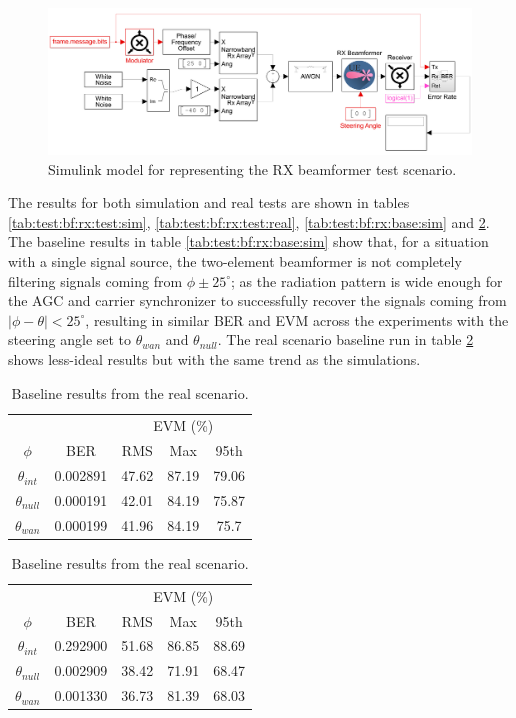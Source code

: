 \documentclass[12pt,a4paper]{report}
\begin{document}
\begin{figure}[h]
    \centering
    \includegraphics[width = \textwidth]{Figures/test_bf_rx_sim.png}
    \caption{Simulink model for representing the RX beamformer test scenario.}
    \label{fig:test:bf:rx:sim}
\end{figure}

The results for both simulation and real tests are shown in tables \ref{tab:test:bf:rx:test:sim}, \ref{tab:test:bf:rx:test:real}, \ref{tab:test:bf:rx:base:sim} and \ref{tab:test:bf:rx:base:real}. The baseline results in table \ref{tab:test:bf:rx:base:sim} show that, for a situation with a single signal source, the two-element beamformer is not completely filtering signals coming from $\phi \pm 25^\circ$; as the radiation pattern is wide enough for the AGC and carrier synchronizer to successfully recover the signals coming from $|\phi - \theta| < 25^\circ$, resulting in similar BER and EVM across the experiments with the steering angle set to $\theta_{wan}$ and $\theta_{null}$. The real scenario baseline run in table \ref{tab:test:bf:rx:base:real} shows less-ideal results but with the same trend as the simulations. 

\begin{table}[h]
    \centering
    \parbox{.45\linewidth}{
    \centering
    \begin{tabular}{c|c|c|c|c}
    & & \multicolumn{3}{c}{EVM (\%)} \\ 
    $\phi$ & BER & RMS & Max & 95th \\ \hline
    $\theta_{int}$ & 0.002891 & 47.62 & 87.19 & 79.06 \\
    $\theta_{null}$ & 0.000191 & 42.01 & 84.19 & 75.87 \\
    $\theta_{wan}$ & 0.000199 & 41.96 & 84.19 & 75.7
	
    \end{tabular}
    \caption[Simulated baseline results for the RX beamformer test.]{Baseline results from the simulated scenario.}
    \label{tab:test:bf:rx:base:sim}
    }
    \hfill
    \parbox{.45\linewidth}{
    \centering
    \begin{tabular}{c|c|c|c|c}
    & & \multicolumn{3}{c}{EVM (\%)} \\
    $\phi$ & BER & RMS & Max & 95th \\ \hline
    $\theta_{int}$ & 0.292900 & 51.68 & 86.85 & 88.69 \\
    $\theta_{null}$   & 0.002909 & 38.42 & 71.91 & 68.47 \\
    $\theta_{wan}$  & 0.001330 & 36.73 & 81.39 & 68.03
    \end{tabular}
    \caption[Real baseline results of the RX beamformer test.]{Baseline results from the real scenario.}
    \label{tab:test:bf:rx:base:real}
    }
\end{table}
\end{document}
